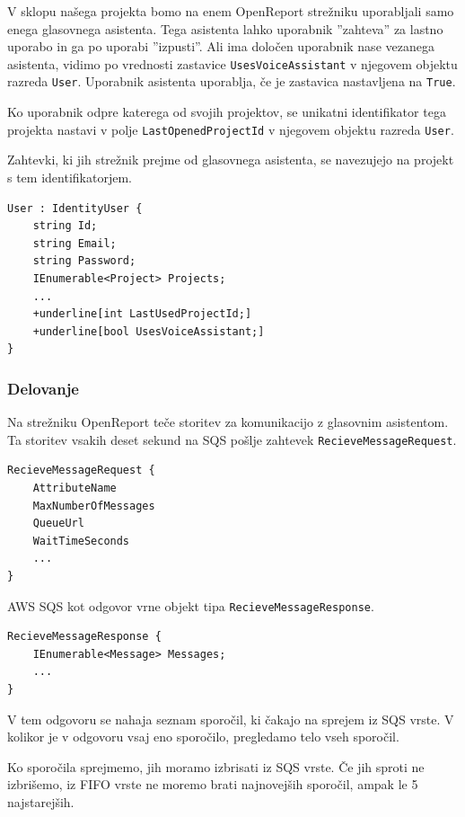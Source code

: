 \documentclass[a4paper, 12pt]{book}
\begin{document}
V sklopu našega projekta bomo na enem OpenReport strežniku uporabljali samo enega glasovnega asistenta.
Tega asistenta lahko uporabnik ''zahteva'' za lastno uporabo in ga po uporabi ''izpusti''.
Ali ima določen uporabnik nase vezanega asistenta, vidimo po vrednosti zastavice \texttt{UsesVoiceAssistant} v njegovem objektu razreda \texttt{User}.
Uporabnik asistenta uporablja, če je zastavica nastavljena na \texttt{True}.

Ko uporabnik odpre katerega od svojih projektov, se unikatni identifikator tega projekta nastavi v polje \texttt{LastOpenedProjectId} v njegovem objektu razreda \texttt{User}.

Zahtevki, ki jih strežnik prejme od glasovnega asistenta, se navezujejo na projekt s tem identifikatorjem.

\begin{Verbatim}[commandchars=+\[\]]
User : IdentityUser {
    string Id; 
    string Email;
    string Password; 
    IEnumerable<Project> Projects;
    ... 
    +underline[int LastUsedProjectId;]
    +underline[bool UsesVoiceAssistant;]
}
\end{Verbatim}

\subsubsection{Delovanje}

Na strežniku OpenReport teče storitev za komunikacijo z glasovnim asistentom.
Ta storitev vsakih deset sekund na SQS pošlje zahtevek \texttt{RecieveMessageRequest}.

\begin{Verbatim}[commandchars=+\[\]]
RecieveMessageRequest {
    AttributeName 
    MaxNumberOfMessages 
    QueueUrl 
    WaitTimeSeconds
    ... 
} 
\end{Verbatim}

AWS SQS kot odgovor vrne objekt tipa \texttt{RecieveMessageResponse}.

\begin{Verbatim}[commandchars=+\[\]]
RecieveMessageResponse {
    IEnumerable<Message> Messages;
    ...
}
\end{Verbatim}

V tem odgovoru se nahaja seznam sporočil, ki čakajo na sprejem iz SQS vrste.
V kolikor je v odgovoru vsaj eno sporočilo, pregledamo telo vseh sporočil. 

Ko sporočila sprejmemo, jih moramo izbrisati iz SQS vrste.
Če jih sproti ne izbrišemo, iz FIFO vrste ne moremo brati najnovejših sporočil, ampak le 5 najstarejših.
\end{document}
